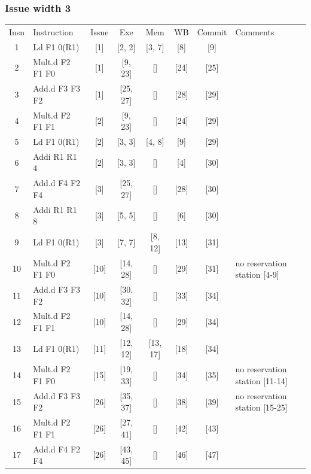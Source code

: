 \documentclass[11pt]{article}
\begin{document}
\subsubsection*{Issue width 3}
\begin{center}
\scriptsize
\setlength{\tabcolsep}{8pt}
\renewcommand{\arraystretch}{1.35}
\begin{tabular}{clccccc>{\raggedright\arraybackslash}p{1.4in}}
Insn & Instruction & Issue & Exe & Mem & WB & Commit & Comments \\
1 & Ld F1 0(R1) & [1] & [2, 2] & [3, 7] & [8] & [9] &  \\
2 & Mult.d F2 F1 F0 & [1] & [9, 23] & [] & [24] & [25] &  \\
3 & Add.d F3 F3 F2 & [1] & [25, 27] & [] & [28] & [29] &  \\
4 & Mult.d F2 F1 F1 & [2] & [9, 23] & [] & [24] & [29] &  \\
5 & Ld F1 0(R1) & [2] & [3, 3] & [4, 8] & [9] & [29] &  \\
6 & Addi R1 R1 4 & [2] & [3, 3] & [] & [4] & [30] &  \\
7 & Add.d F4 F2 F4 & [3] & [25, 27] & [] & [28] & [30] &  \\
8 & Addi R1 R1 8 & [3] & [5, 5] & [] & [6] & [30] &  \\
9 & Ld F1 0(R1) & [3] & [7, 7] & [8, 12] & [13] & [31] &  \\
10 & Mult.d F2 F1 F0 & [10] & [14, 28] & [] & [29] & [31] & no reservation station [4-9] \\
11 & Add.d F3 F3 F2 & [10] & [30, 32] & [] & [33] & [34] &  \\
12 & Mult.d F2 F1 F1 & [10] & [14, 28] & [] & [29] & [34] &  \\
13 & Ld F1 0(R1) & [11] & [12, 12] & [13, 17] & [18] & [34] &  \\
14 & Mult.d F2 F1 F0 & [15] & [19, 33] & [] & [34] & [35] & no reservation station [11-14] \\
15 & Add.d F3 F3 F2 & [26] & [35, 37] & [] & [38] & [39] & no reservation station [15-25] \\
16 & Mult.d F2 F1 F1 & [26] & [27, 41] & [] & [42] & [43] &  \\
17 & Add.d F4 F2 F4 & [26] & [43, 45] & [] & [46] & [47] &  \\
\end{tabular}
\end{center}
\end{document}
